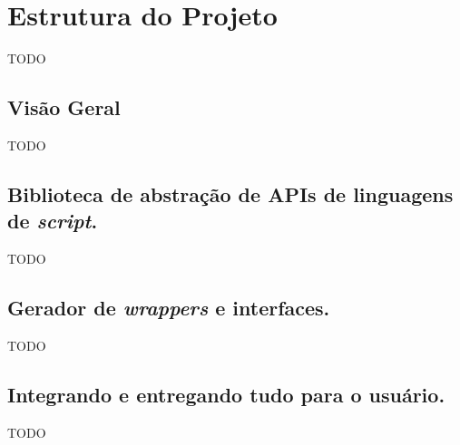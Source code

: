 \chapter{Estrutura do Projeto}
\label{sec:estrutura}
TODO

\section{Visão Geral}
\label{sec:estrutura:geral}

TODO

\section{Biblioteca de abstração de APIs de linguagens de \emph{script}.}
\label{sec:estrutura:opa}
TODO

\section{Gerador de \emph{wrappers} e interfaces.}
\label{sec:estrutura:opwig}
TODO

\section{Integrando e entregando tudo para o usuário.}
\label{sec:estrutura:integration}
TODO
